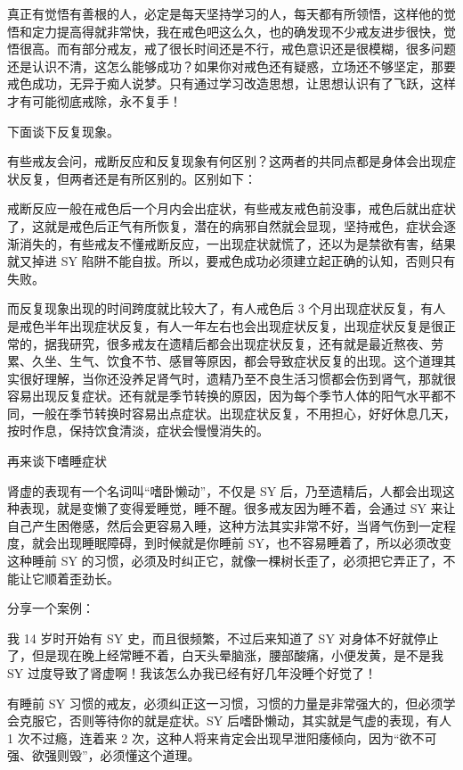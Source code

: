 \documentclass[fontset=founder]{ctexart}
\begin{document}
真正有觉悟有善根的人，必定是每天坚持学习的人，每天都有所领悟，这样他的觉悟和定力提高得就非常快，我在戒色吧这么久，也的确发现不少戒友进步很快，觉悟很高。而有部分戒友，戒了很长时间还是不行，戒色意识还是很模糊，很多问题还是认识不清，这怎么能够成功？如果你对戒色还有疑惑，立场还不够坚定，那要戒色成功，无异于痴人说梦。只有通过学习改造思想，让思想认识有了飞跃，这样才有可能彻底戒除，永不复手！

下面谈下反复现象。

有些戒友会问，戒断反应和反复现象有何区别？这两者的共同点都是身体会出现症状反复，但两者还是有所区别的。区别如下：

戒断反应一般在戒色后一个月内会出症状，有些戒友戒色前没事，戒色后就出症状了，这就是戒色后正气有所恢复，潜在的病邪自然就会显现，坚持戒色，症状会逐渐消失的，有些戒友不懂戒断反应，一出现症状就慌了，还以为是禁欲有害，结果就又掉进 SY 陷阱不能自拔。所以，要戒色成功必须建立起正确的认知，否则只有失败。

而反复现象出现的时间跨度就比较大了，有人戒色后 3 个月出现症状反复，有人是戒色半年出现症状反复，有人一年左右也会出现症状反复，出现症状反复是很正常的，据我研究，很多戒友在遗精后都会出现症状反复，还有就是最近熬夜、劳累、久坐、生气、饮食不节、感冒等原因，都会导致症状反复的出现。这个道理其实很好理解，当你还没养足肾气时，遗精乃至不良生活习惯都会伤到肾气，那就很容易出现反复症状。还有就是季节转换的原因，因为每个季节人体的阳气水平都不同，一般在季节转换时容易出点症状。出现症状反复，不用担心，好好休息几天，按时作息，保持饮食清淡，症状会慢慢消失的。

再来谈下嗜睡症状

肾虚的表现有一个名词叫“嗜卧懒动”，不仅是 SY 后，乃至遗精后，人都会出现这种表现，就是变懒了变得爱睡觉，睡不醒。很多戒友因为睡不着，会通过 SY 来让自己产生困倦感，然后会更容易入睡，这种方法其实非常不好，当肾气伤到一定程度，就会出现睡眠障碍，到时候就是你睡前 SY，也不容易睡着了，所以必须改变这种睡前 SY 的习惯，必须及时纠正它，就像一棵树长歪了，必须把它弄正了，不能让它顺着歪劲长。

分享一个案例：

我 14 岁时开始有 SY 史，而且很频繁，不过后来知道了 SY 对身体不好就停止了，但是现在晚上经常睡不着，白天头晕脑涨，腰部酸痛，小便发黄，是不是我 SY 过度导致了肾虚啊！我该怎么办我已经有好几年没睡个好觉了！

有睡前 SY 习惯的戒友，必须纠正这一习惯，习惯的力量是非常强大的，但必须学会克服它，否则等待你的就是症状。SY 后嗜卧懒动，其实就是气虚的表现，有人 1 次不过瘾，连着来 2 次，这种人将来肯定会出现早泄阳痿倾向，因为“欲不可强、欲强则毁”，必须懂这个道理。
\end{document}
